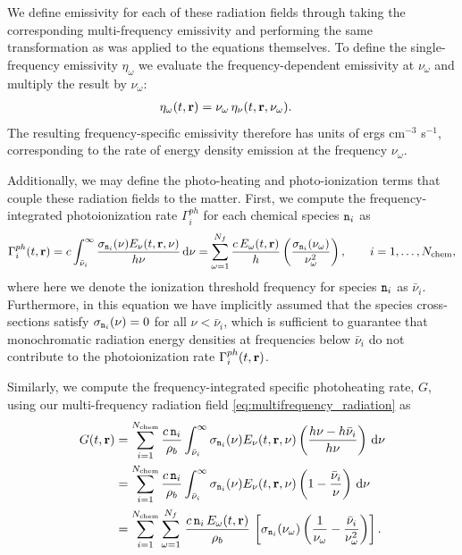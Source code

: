 \documentclass[10pt]{article}
\renewcommand{\(}{\left(}
\renewcommand{\)}{\right)}
\newcommand{\rvec}{{\bf r}}
\newcommand{\rhob}{\rho_b}
\newcommand{\Enu}{E_{\nu}}
\newcommand{\mn}{{\tt n}}
\begin{document}
We define emissivity for each of these radiation fields through taking
the corresponding multi-frequency emissivity and performing the same
transformation as was applied to the equations themselves.  To define
the single-frequency emissivity $\eta_{\omega}$ we evaluate the
frequency-dependent emissivity at $\nu_{\omega}$ and multiply the
result by $\nu_{\omega}$:
\begin{align}
\label{eq:multifrequency_emissivity}
  \eta_{\omega}(t,\rvec) &= \nu_{\omega}\, \eta_{\nu}(t,\rvec,\nu_{\omega}).
\end{align}
The resulting frequency-specific emissivity therefore has units of ergs
cm$^{-3}$ s$^{-1}$, corresponding to the rate of energy density
emission at the frequency $\nu_{\omega}$.

Additionally, we may define the photo-heating and photo-ionization
terms that couple these radiation fields to the matter.  
First, we compute the frequency-integrated photoionization rate
$\Gamma_i^{ph}$ for each chemical species $\mn_i$ as
\begin{equation}
\label{eq:multifrequency_photoionization}
   \Gamma_i^{ph}(t,\rvec)  = 
   c \int_{\bar{\nu}_i}^{\infty} \frac{\sigma_{\mn_i}(\nu)\Enu(t,\rvec,\nu)}{h\nu}\,\mathrm d\nu =  
   \sum_{\omega=1}^{N_f} \frac{c\, E_{\omega}(t,\rvec)}{h} 
   \left(\frac{\sigma_{\mn_i}(\nu_{\omega})}{\nu_{\omega}^2}\right), 
   \qquad i=1,\ldots,N_\text{chem},
\end{equation}
where here we denote the ionization threshold frequency for species
$\mn_i$ as $\bar{\nu}_i$.  Furthermore, in this equation we have
implicitly assumed that the species cross-sections satisfy
$\sigma_{\mn_i}(\nu) = 0$ for all $\nu < \bar{\nu}_i$, which is
sufficient to guarantee that monochromatic radiation energy densities
at frequencies below $\bar{\nu}_i$ do not contribute to the
photoionization rate $\Gamma_i^{ph}(t,\rvec)$. 

Similarly, we compute the frequency-integrated specific photoheating
rate, $G$, using our multi-frequency radiation field
\eqref{eq:multifrequency_radiation} as 
\begin{align}
\notag
   G(t,\rvec) &= 
   \sum_{i=1}^{N_\text{chem}} \frac{c\, \mn_i}{\rhob}
     \int_{\bar{\nu}_i}^{\infty} \sigma_{\mn_i}(\nu) \Enu(t,\rvec,\nu)
     \left(\frac{h\nu - h\bar{\nu}_i}{h\nu}\right)\,\mathrm d\nu \\
\label{eq:multifrequency_photoheating}
   &= 
   \sum_{i=1}^{N_\text{chem}} \frac{c\, \mn_i}{\rhob}
     \int_{\bar{\nu}_i}^{\infty} \sigma_{\mn_i}(\nu) \Enu(t,\rvec,\nu)
     \left(1 - \frac{\bar{\nu}_i}{\nu}\right)\,\mathrm d\nu \\
\notag
   &= 
   \sum_{i=1}^{N_\text{chem}} \sum_{\omega=1}^{N_f}\,
     \frac{c\, \mn_i\, E_{\omega}(t,\rvec)}{\rhob}\,
     \left[\sigma_{\mn_i}(\nu_{\omega}) \left(\frac{1}{\nu_{\omega}} - \frac{\bar{\nu}_i}{\nu_{\omega}^2}\right)\right].
\end{align}
\end{document}
